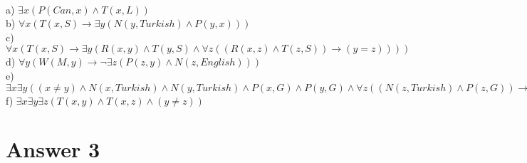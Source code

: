 \documentclass[12pt]{article}
\begin{document}
\hspace{5mm} \\
\hspace{5mm} a) $ \exists x (P(Can,x) \wedge T(x,L)) $\\
\hspace{5mm} b) $ \forall x (T(x,S) \rightarrow \exists y(N(y,Turkish) \wedge P(y,x))) $\\
\hspace{5mm} c) $ \forall x (T(x,S) \rightarrow \exists y( R(x,y) \wedge T(y,S) \wedge \forall z(( R(x,z) \wedge T(z,S)) \rightarrow (y=z))))$\\
\hspace{5mm} d) $ \forall y  (W(M,y) \rightarrow \neg \exists z(P(z,y) \wedge N(z,English)))$\\
\hspace{5mm} e) $ \exists x \exists y ((x \not=y) \wedge N(x,Turkish) \wedge N(y,Turkish) \wedge P(x,G) \wedge P(y,G) \wedge \forall z((N(z,Turkish) \wedge	 P(z,G)) \rightarrow (z =x  \lor z=y )))$\\
\hspace{5mm} f) $ \exists x \exists y \exists z (T(x,y) \wedge T(x,z) \wedge (y \not=z))$\\


\section*{Answer 3}
\end{document}
